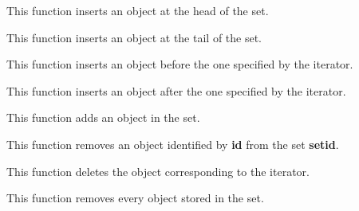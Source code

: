
This function inserts an object at the head of the set.


This function inserts an object at the tail of the set.


This function inserts an object before the one specified by the iterator.


This function inserts an object after the one specified by the iterator.


This function adds an object in the set.


This function removes an object identified by \textbf{id} from the
set \textbf{setid}.


This function deletes the object corresponding to the iterator.


This function removes every object stored in the set.


